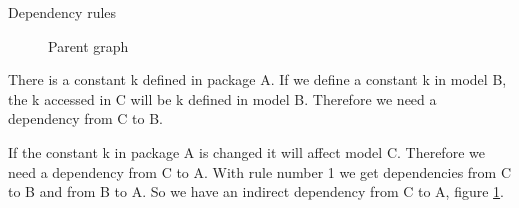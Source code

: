 \documentclass{cslthse-msc}
\begin{document}
Dependency rules
\begin{figure}[H]
    \centering
    \qquad
    \subfloat{{}}
    \caption{Parent graph}
    \label{fig:parentGraph}
\end{figure}

There is a constant k defined in package A. If we define a constant k in model B, the k accessed in C will be k defined in model B. Therefore we need a dependency from C to B.

If the constant k in package A is changed it will affect model C. Therefore we need a dependency from C to A. With rule number 1 we get dependencies from C to B and from B to A. So we have an indirect dependency from C to A, figure \ref{fig:parentGraph}.
\end{document}

